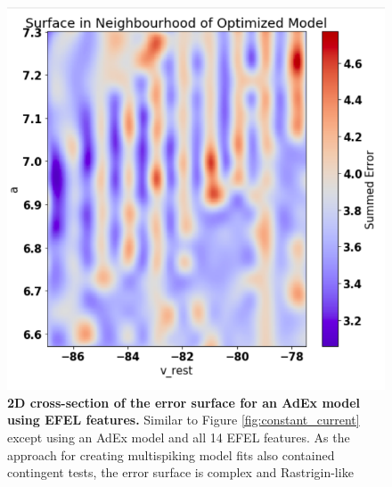 \begin{figure}
    \centering
    \includegraphics[scale=0.75]{figures/corrogations.png}
        \caption[A Complicated Error Surface]{\textbf{2D cross-section of the error surface for an AdEx model using EFEL features.}
    Similar to Figure \ref{fig:constant_current} except using an AdEx model and all 14 EFEL features.
    As the approach for creating multispiking model fits also contained contingent tests, the error surface is complex and Rastrigin-like}
    \label{fig:real_problem_nontrivial_surface-1}
\end{figure}



